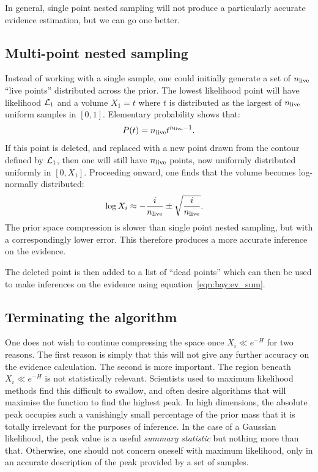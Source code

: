 In general, single point nested sampling will not produce a particularly accurate evidence estimation, but we can go one better.


\subsection{Multi-point nested sampling}
Instead of working with a single sample, one could initially generate a set of $n_{\mathrm{live}}$ ``live points'' distributed across the prior. The lowest likelihood point will have likelihood $\mathcal{L}_1$ and a volume $X_1 = t$ where $t$ is distributed as the largest of $n_{\mathrm{live}}$ uniform samples in $[0,1]$. Elementary probability shows that:
\begin{equation}
  P(t) = n_{\mathrm{live}} t^{n_{\mathrm{live}}-1}.
  \label{eqn:bay:t_prob}
\end{equation}
If this point is deleted, and replaced with a new point drawn from the contour defined by $\mathcal{L}_1$, then one will still have $n_{\mathrm{live}}$ points, now uniformly distributed uniformly in $[0,X_1]$. Proceeding onward, one finds that the volume becomes log-normally distributed:
\begin{align}
  \log X_i  &\approx -\frac{i}{n_{\mathrm{live}}} \pm \sqrt{\frac{i}{n_{\mathrm{live}}}}.
  \label{eqn:bay:log_normal_1_n}
\end{align}
The prior space compression is slower than single point nested sampling, but with a correspondingly lower error. This therefore produces a more accurate inference on the evidence.

The deleted point is then added to a list of ``dead points'' which can then be used to make inferences on the evidence using equation~\eqref{eqn:bay:ev_sum}.

\subsection{Terminating the algorithm}
One does not wish to continue compressing the space once $X_i\ll e^{-H}$ for two reasons. The first reason is simply that this will not give any further accuracy on the evidence calculation. The second is more important. The region beneath $X_i\ll e^{-H}$ is not statistically relevant. Scientists used to maximum likelihood methods find this difficult to swallow, and often desire algorithms that will maximise the function to find the highest peak. In high dimensions, the absolute peak occupies such a vanishingly small percentage of the prior mass that it is totally irrelevant for the purposes of inference. In the case of a Gaussian likelihood, the peak value is a useful {\em summary statistic\/} but nothing more than that. Otherwise, one should not concern oneself with maximum likelihood, only in an accurate description of the peak provided by a set of samples.

